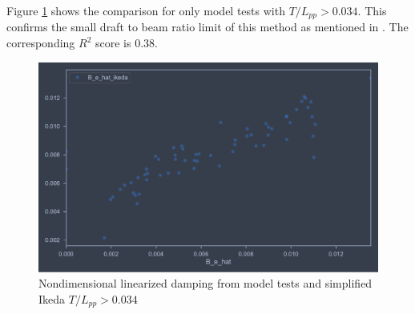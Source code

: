 Figure \ref{fig:B_e_hat_good} shows the comparison for only model tests with $T/L_{pp}>0.034$.
This confirms the small draft to beam ratio limit of this method as mentioned in \cite{kawahara_simple_2011}. The corresponding $R^2$ score is 0.38.

\begin{figure}[H]
    \centering
    \includegraphics[width=\columnwidth]{figures/B_e_hat_good.pdf}
    \caption{Nondimensional linearized damping from model tests and simplified Ikeda $T/L_{pp}>0.034$}
    \label{fig:B_e_hat_good}
\end{figure}




